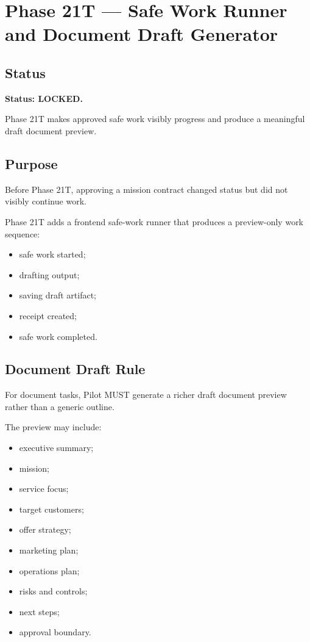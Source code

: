 \section{Phase 21T --- Safe Work Runner and Document Draft Generator}
\label{sec:aion-phase21t-safe-work-runner-document-draft}

\subsection{Status}

\textbf{Status: LOCKED.}

Phase 21T makes approved safe work visibly progress and produce a meaningful draft document preview.

\subsection{Purpose}

Before Phase 21T, approving a mission contract changed status but did not visibly continue work.

Phase 21T adds a frontend safe-work runner that produces a preview-only work sequence:

\begin{itemize}
  \item safe work started;
  \item drafting output;
  \item saving draft artifact;
  \item receipt created;
  \item safe work completed.
\end{itemize}

\subsection{Document Draft Rule}

For document tasks, Pilot MUST generate a richer draft document preview rather than a generic outline.

The preview may include:

\begin{itemize}
  \item executive summary;
  \item mission;
  \item service focus;
  \item target customers;
  \item offer strategy;
  \item marketing plan;
  \item operations plan;
  \item risks and controls;
  \item next steps;
  \item approval boundary.
\end{itemize}

